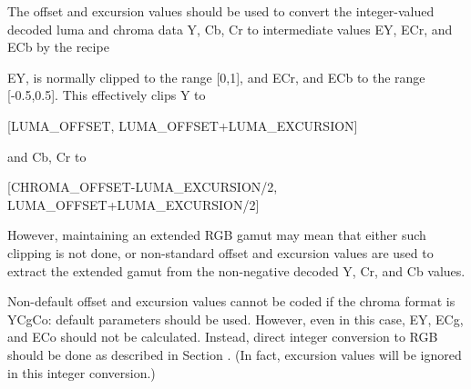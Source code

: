 \label{signalranges}

The offset and excursion values should be used to convert the
integer-valued decoded luma and chroma data Y, Cb, Cr to intermediate
values EY, ECr, and ECb by the recipe



EY, is normally clipped to the range [0,1], and ECr, and ECb to the
range [-0.5,0.5]. This effectively clips Y to 

[LUMA\_OFFSET, LUMA\_OFFSET+LUMA\_EXCURSION]

and Cb, Cr to

[CHROMA\_OFFSET-LUMA\_EXCURSION/2, LUMA\_OFFSET+LUMA\_EXCURSION/2]

However, maintaining an extended RGB gamut may mean that either such
clipping is not done, or non-standard offset and excursion values are
used to extract the extended gamut from the non-negative decoded Y, Cr,
and Cb values.

Non-default offset and excursion values cannot be coded if the chroma
format is YCgCo: default parameters should be used. However, even in
this case, EY, ECg, and ECo should not be calculated. Instead, direct
integer conversion to RGB should be done as described in Section . (In
fact, excursion values will be ignored in this integer conversion.)

